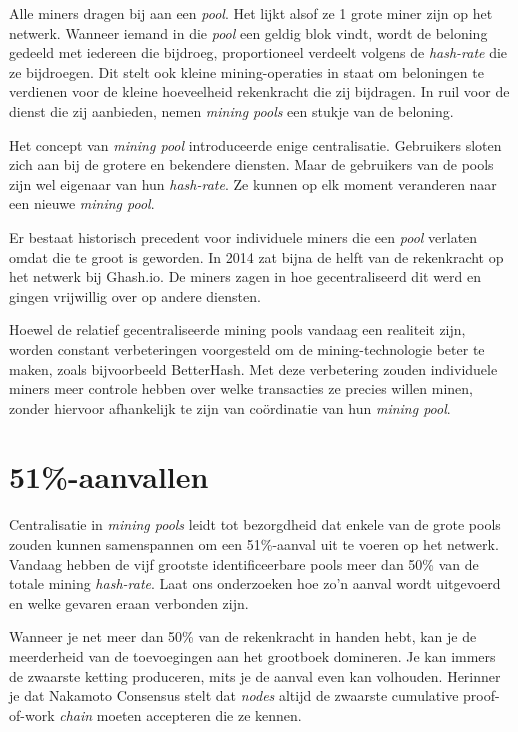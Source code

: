 Alle miners dragen bij aan een \textit{pool}. Het lijkt alsof ze 1 grote miner zijn op het netwerk. Wanneer iemand in die \textit{pool} een geldig blok vindt, wordt de beloning gedeeld met iedereen die bijdroeg, proportioneel verdeelt volgens de \textit{hash-rate} die ze bijdroegen. Dit stelt ook kleine mining-operaties in staat om beloningen te verdienen voor de kleine hoeveelheid rekenkracht die zij bijdragen. In ruil voor de dienst die zij aanbieden, nemen \textit{mining pools} een stukje van de beloning.

Het concept van \textit{mining pool} introduceerde enige centralisatie. Gebruikers sloten zich aan bij de grotere en bekendere diensten. Maar de gebruikers van de pools zijn wel eigenaar van hun \textit{hash-rate}. Ze kunnen op elk moment veranderen naar een nieuwe \textit{mining pool}.

Er bestaat historisch precedent voor individuele miners die een \textit{pool} verlaten omdat die te groot is geworden. In 2014 zat bijna de helft van de rekenkracht op het netwerk bij Ghash.io. De miners zagen in hoe gecentraliseerd dit werd en gingen vrijwillig over op andere diensten.

Hoewel de relatief gecentraliseerde mining pools vandaag een realiteit zijn, worden constant verbeteringen voorgesteld om de mining-technologie beter te maken, zoals bijvoorbeeld BetterHash. Met deze verbetering zouden individuele miners meer controle hebben over welke transacties ze precies willen minen, zonder hiervoor afhankelijk te zijn van coördinatie van hun \textit{mining pool}.

\section{51\%-aanvallen}
Centralisatie in \textit{mining pools} leidt tot bezorgdheid dat enkele van de grote pools zouden kunnen samenspannen om een 51\%-aanval uit te voeren op het netwerk. Vandaag hebben de vijf grootste identificeerbare pools meer dan 50\% van de totale mining \textit{hash-rate}. Laat ons onderzoeken hoe zo’n aanval wordt uitgevoerd en welke gevaren eraan verbonden zijn.

Wanneer je net meer dan 50\% van de rekenkracht in handen hebt, kan je de meerderheid van de toevoegingen aan het grootboek domineren. Je kan immers de zwaarste ketting produceren, mits je de aanval even kan volhouden. Herinner je dat Nakamoto Consensus stelt dat \textit{nodes} altijd de zwaarste cumulative proof-of-work \textit{chain} moeten accepteren die ze kennen.

